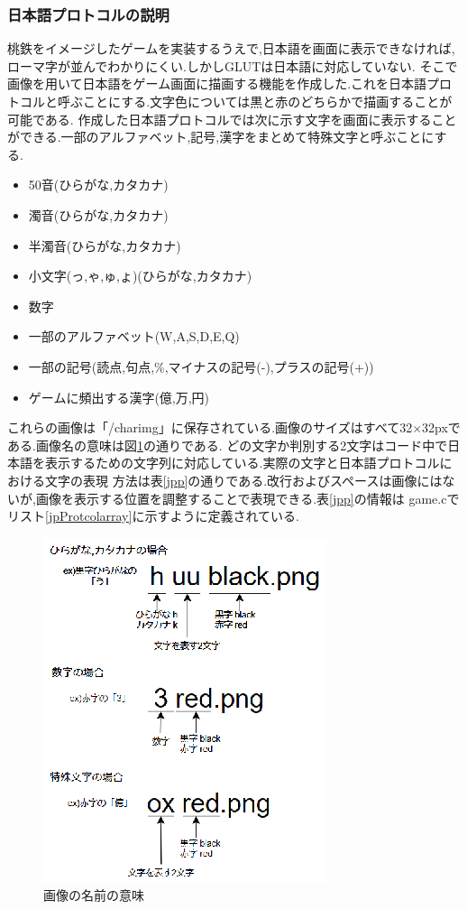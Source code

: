 \documentclass[a4j]{jarticle}
\begin{document}
    \subsubsection{日本語プロトコルの説明}
    桃鉄をイメージしたゲームを実装するうえで,日本語を画面に表示できなければ,ローマ字が並んでわかりにくい.しかしGLUTは日本語に対応していない.
    そこで画像を用いて日本語をゲーム画面に描画する機能を作成した.これを日本語プロトコルと呼ぶことにする.文字色については黒と赤のどちらかで描画することが可能である.
    作成した日本語プロトコルでは次に示す文字を画面に表示することができる.一部のアルファベット,記号,漢字をまとめて特殊文字と呼ぶことにする.
    \begin{itemize}
      \item 50音(ひらがな,カタカナ)
      \item 濁音(ひらがな,カタカナ)
      \item 半濁音(ひらがな,カタカナ)
      \item 小文字(っ,ゃ,ゅ,ょ)(ひらがな,カタカナ)
      \item 数字
      \item 一部のアルファベット(W,A,S,D,E,Q)
      \item 一部の記号(読点,句点,\%,マイナスの記号(-),プラスの記号(+))
      \item ゲームに頻出する漢字(億,万,円)
    \end{itemize}

    これらの画像は「/charimg」に保存されている.画像のサイズはすべて32$\times$32pxである.画像名の意味は図\ref{howname}の通りである.
    どの文字か判別する2文字はコード中で日本語を表示するための文字列に対応している.実際の文字と日本語プロトコルにおける文字の表現
    方法は表\ref{jpp}の通りである.改行およびスペースは画像にはないが,画像を表示する位置を調整することで表現できる.表\ref{jpp}の情報は
    game.cでリスト\ref{jpProtcolarray}に示すように定義されている.
    
    \begin{figure}[H]
      \centering
      \includegraphics[scale=1.7]{howname.eps}
      \caption{画像の名前の意味}
       \label{howname}
      \end{figure}    
\end{document}
